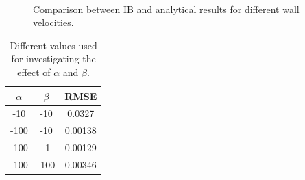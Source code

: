 \begin{figure}[H]
	\centering
	\quad
	\\
	\quad
	\caption{Comparison between IB and analytical results for different wall velocities.}
	\label{fig:C3_virtualBoundaryResultConstant}
\end{figure}

\begin{table}[H]
\centering
\begin{tabular}{c | c | c}
	 $\alpha$ & $\beta$ & RMSE \\ \hline \hline
	 -10 & -10 & 0.0327 \\ \hline
	 -100 & -10 & 0.00138 \\ \hline
	 -100 & -1 & 0.00129 \\ \hline
	 -100 & -100 & 0.00346 \\
\end{tabular}
\caption{Different values used for investigating the effect of $\alpha$ and $\beta$.}
\label{table:C3_virtualBoundaryResultConstantRSME}
\end{table}
